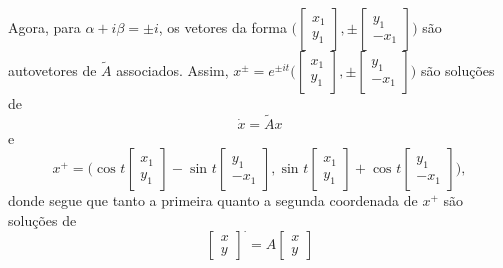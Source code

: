 \documentclass[../functional_analysis.tex]{subfiles}
\begin{document}
Agora, para \(\alpha +i\beta  = \pm i\), os vetores da forma \(\biggl(\begin{bmatrix}
		x_1 \\
		y_1
	\end{bmatrix}, \pm \begin{bmatrix}
		y_1 \\
		-x_1
	\end{bmatrix}\biggr)\) são autovetores de \(\tilde{A}\) associados. Assim, \(x^{\pm} = e^{\pm it} \biggl(\begin{bmatrix}
		x_1 \\
		y_1
	\end{bmatrix}, \pm \begin{bmatrix}
		y_1 \\
		-x_1
	\end{bmatrix}\biggr)\) são soluções de
\[
	\dot{x} = \tilde{A}x
\]
e
\[
	x^{+} = \biggl(\cos^{}{t \begin{bmatrix}
			x_1 \\
			y_1
		\end{bmatrix}} - \sin^{}{t \begin{bmatrix}
			y_1 \\
			-x_1
		\end{bmatrix}}, \sin^{}{t \begin{bmatrix}
			x_1 \\
			y_1
		\end{bmatrix}} + \cos^{}{t \begin{bmatrix}
			y_1 \\
			-x_1
		\end{bmatrix}}\biggr),
\]
donde segue que tanto a primeira quanto a segunda coordenada de \(x^{+}\) são soluções de
\[
	\begin{bmatrix}
		x \\
		y
	\end{bmatrix}^{\cdot} = A \begin{bmatrix}
		x \\
		y
	\end{bmatrix}
\]
\end{document}
